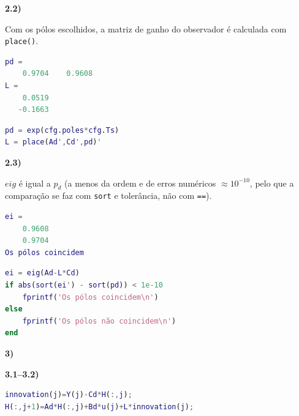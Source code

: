 \documentclass[12pt]{report}
\begin{document}
\textbf{2.2)}
\noindent
\begin{minipage}[t]{0.40\textwidth}
Com os pólos escolhidos, a matriz de ganho do observador é calculada com \lstinline{place()}.
\begin{lstlisting}[language=Matlab, caption={Resultado}, label={lst:obs_result}, numbers=none]
pd =
    0.9704    0.9608
L =
    0.0519
   -0.1663
\end{lstlisting}
\end{minipage}
\hfill
\begin{minipage}[t]{0.45\textwidth}
\begin{lstlisting}[language=Matlab]
pd = exp(cfg.poles*cfg.Ts)
L = place(Ad',Cd',pd)'
\end{lstlisting}
\label{lst:obsv}

\end{minipage}

\textbf{2.3)}
\begin{minipage}[t]{0.40\textwidth}
$eig$ é igual a $p_d$ (a menos da ordem e de erros numéricos $\approx10^{-10}$, pelo que a comparação se faz com \texttt{sort} e tolerância, não com \texttt{==}).
\begin{lstlisting}[language=Matlab, caption={Resultado}, label={lst:obs_result}, numbers=none]
ei =
    0.9608 
    0.9704
Os pólos coincidem
\end{lstlisting}
\end{minipage}
\hfill
\begin{minipage}[t]{0.45\textwidth}
\begin{lstlisting}[language=Matlab]
ei = eig(Ad-L*Cd)
if abs(sort(ei') - sort(pd)) < 1e-10
    fprintf('Os pólos coincidem\n')
else
    fprintf('Os pólos não coincidem\n')
end
\end{lstlisting}
\label{lst:polos}
\end{minipage}

\noindent \textbf{3)}

\textbf{3.1--3.2)} 

\begin{lstlisting}[language=Matlab, caption={Inovação e atualização do observador}, label={lst:inov}]
innovation(j)=Y(j)-Cd*H(:,j);
H(:,j+1)=Ad*H(:,j)+Bd*u(j)+L*innovation(j);
\end{lstlisting}
\end{document}

